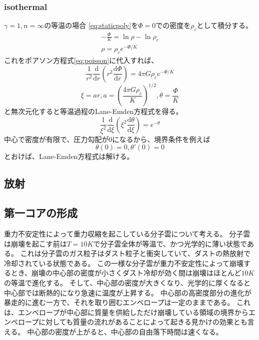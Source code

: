 \documentclass{jsarticle}
\newcommand{\dder}[2][]{\frac{\mathrm{d}#1}{\mathrm{d}#2}}
\begin{document}
\subsubsection{isothermal}
$\gamma=1,n=\infty$の等温の場合
\eqref{eq:staticpoly}を$\Phi=0$での密度を$\rho_c$として積分する。
\begin{align}
    - \frac{\Phi}{K} = \ln \rho - \ln \rho_c\\
    \rho = \rho_ce^{-\Phi/K}
\end{align}
これをポアソン方程式\eqref{eq:poisson}に代入すれば、
\begin{equation}
    \frac{1}{r^2}\dder[]{r}(r^2\dder[\Phi]{r}) = 4\pi G\rho_c e^{-\Phi/K}
\end{equation}
\begin{equation}
    \xi = ar, a = \left( \frac{4\pi G \rho_c}{K}\right)^{1/2}, \theta = \frac{\Phi}{K}
\end{equation}
と無次元化すると等温過程のLane-Emden方程式を得る。
\begin{equation}
    \frac{1}{\xi^2}\dder[]{\xi}\left(\xi^2\dder[\theta]{\xi}\right) = e^{-\theta}
\end{equation}
中心で密度が有限で、圧力勾配が$0$になるから、境界条件を例えば
\begin{equation}
    \theta(0) = 0,    \theta'(0) = 0
\end{equation}
とおけば、Lane-Emden方程式は解ける。
\subsection{放射}
\subsection{第一コアの形成}
重力不安定性によって重力収縮を起こしている分子雲について考える。
分子雲は崩壊を起こす前は$T=10K$で分子雲全体が等温で、かつ光学的に薄い状態である。
これは分子雲のガス粒子はダスト粒子と衝突していて、ダストの熱放射で冷却されている状態である。
この一様な分子雲が重力不安定性によって崩壊するとき、崩壊の中心部の密度が小さくダスト冷却が効く間は崩壊はほとんど$10K$の等温で進化する。
そして、中心部の密度が大きくなり、光学的に厚くなると中心部では断熱的になり急速に温度が上昇する。
中心部の高密度部分の進化が暴走的に進む一方で、それを取り囲むエンベロープは一定のままである。
これは、エンベロープが中心部に質量を供給しただけ崩壊している領域の境界からエンベロープに対しても質量の流れがあることによって起きる見かけの効果とも言える。
中心部の密度が上がると、中心部の自由落下時間は速くなる。
\end{document}
